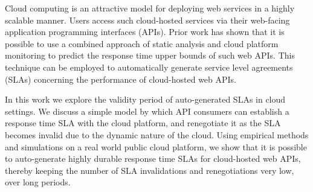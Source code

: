 Cloud computing is an attractive model for deploying web services in
a highly scalable manner. Users access such
cloud-hosted services via their web-facing application programming
interfaces (APIs). Prior work has shown that it is possible to use a combined
approach of static analysis and cloud platform monitoring to predict the response
time upper bounds of such web APIs. This technique can be employed to
automatically generate service level agreements (SLAs) concerning the
performance of cloud-hosted web APIs.

In this work we explore the validity period of auto-generated SLAs in
cloud settings. We discuss a simple model by which API consumers
can establish a response time SLA with the cloud platform, and renegotiate it as the SLA
becomes invalid due to the dynamic nature of the cloud.
Using empirical methods and simulations on a real world
public cloud platform, we show that it is possible to auto-generate
highly durable response time SLAs for cloud-hosted web APIs, thereby
keeping the number of SLA invalidations and renegotiations very low, over
long periods.